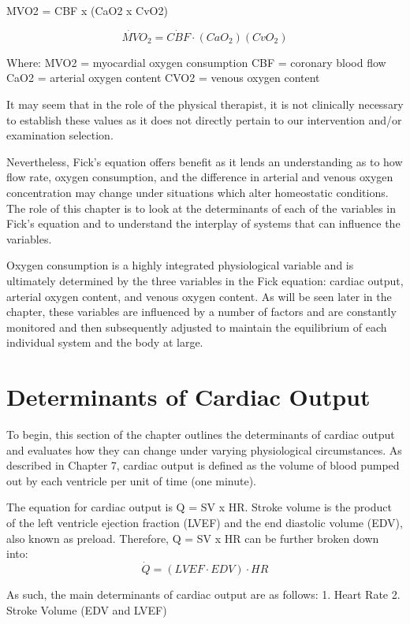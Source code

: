 MVO2 = CBF x (CaO2 x CvO2) 

\begin{equation}
    \dot{MV}O_2 = \dot{CBF} \cdot (CaO_2)(CvO_2)
\end{equation}

Where:
MVO2 = myocardial oxygen consumption
CBF = coronary blood flow
CaO2 = arterial oxygen content
CVO2 = venous oxygen content

It may seem that in the role of the physical therapist, it is not clinically necessary to establish these values as it does not directly pertain to our intervention and/or examination selection. 

Nevertheless, Fick’s equation offers benefit as it lends an understanding as to how flow rate, oxygen consumption, and the difference in arterial and venous oxygen concentration may change under situations which alter homeostatic conditions. The role of this chapter is to look at the determinants of each of the variables in Fick's equation and to understand the interplay of systems that can influence the variables. 

Oxygen consumption is a highly integrated physiological variable and is ultimately determined by the three variables in the Fick equation: cardiac output, arterial oxygen content, and venous oxygen content. As will be seen later in the chapter, these variables are influenced by a number of factors and are constantly monitored and then subsequently adjusted to maintain the equilibrium of each individual system and the body at large. 


\section{Determinants of Cardiac Output}
To begin, this section of the chapter outlines the determinants of cardiac output and evaluates how they can change under varying physiological circumstances. As described in Chapter 7, cardiac output is defined as the volume of blood pumped out by each ventricle per unit of time (one minute). 

The equation for cardiac output is Q = SV x HR. Stroke volume is the product of the left ventricle ejection fraction (LVEF) and the end diastolic volume (EDV), also known as preload. Therefore, Q = SV x HR can be further broken down into: 
 \begin{equation}
    \dot{Q} = (LVEF \cdot EDV) \cdot HR
\end{equation}

 As such, the main determinants of cardiac output are as follows:
1. Heart Rate
2. Stroke Volume (EDV and LVEF) 

